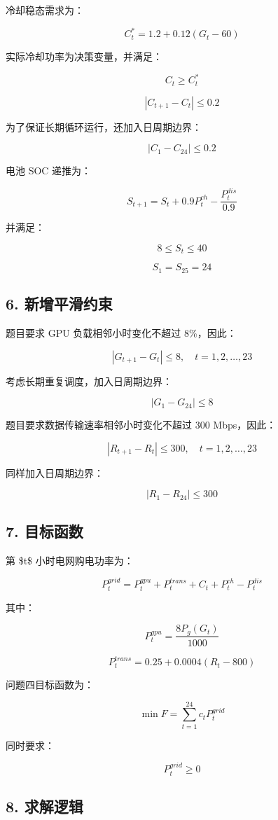 \documentclass[
]{article}
\begin{document}
冷却稳态需求为：

\[C_t^*=1.2+0.12(G_t-60)\]

实际冷却功率为决策变量，并满足：

\[C_t\ge C_t^*\]

\[|C_{t+1}-C_t|\le 0.2\]

为了保证长期循环运行，还加入日周期边界：

\[|C_1-C_{24}|\le 0.2\]

电池 SOC 递推为：

\[S_{t+1}=S_t+0.9P_t^{ch}-\frac{P_t^{dis}}{0.9}\]

并满足：

\[8\le S_t\le 40\]

\[S_1=S_{25}=24\]

\subsection{6.
新增平滑约束}\label{6-ux65b0ux589eux5e73ux6ed1ux7ea6ux675f}

题目要求 GPU 负载相邻小时变化不超过 8\%，因此：

\[|G_{t+1}-G_t|\le 8,\quad t=1,2,\dots,23\]

考虑长期重复调度，加入日周期边界：

\[|G_1-G_{24}|\le 8\]

题目要求数据传输速率相邻小时变化不超过 300 Mbps，因此：

\[|R_{t+1}-R_t|\le 300,\quad t=1,2,\dots,23\]

同样加入日周期边界：

\[|R_1-R_{24}|\le 300\]

\subsection{7. 目标函数}\label{7-ux76eeux6807ux51fdux6570}

第 \$t\$ 小时电网购电功率为：

\[P_t^{grid}=P_t^{gpu}+P_t^{trans}+C_t+P_t^{ch}-P_t^{dis}\]

其中：

\[P_t^{gpu}=\frac{8P_g(G_t)}{1000}\]

\[P_t^{trans}=0.25+0.0004(R_t-800)\]

问题四目标函数为：

\[\min F=\sum_{t=1}^{24} c_tP_t^{grid}\]

同时要求：

\[P_t^{grid}\ge 0\]

\subsection{8. 求解逻辑}\label{8-ux6c42ux89e3ux903bux8f91}
\end{document}
